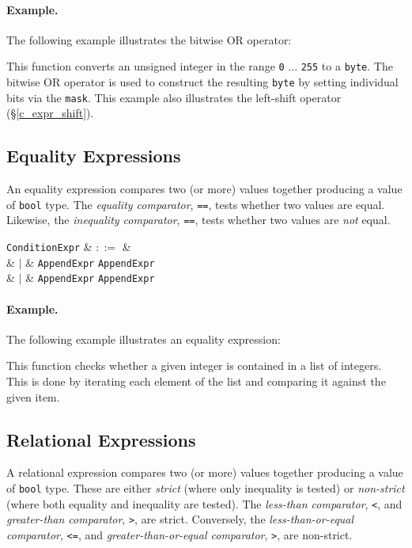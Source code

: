 \paragraph{Example.}  The following example illustrates the bitwise OR operator:



This function converts an unsigned integer in the range \lstinline{0} ... \lstinline{255} to a \lstinline{byte}.  The bitwise OR operator is used to construct the resulting \lstinline{byte} by setting individual bits via the \lstinline{mask}.  This example also illustrates the left-shift operator (\S\ref{c_expr_shift}).


\subsection{Equality Expressions}
\label{c_expr_equality}
An equality expression compares two (or more) values together producing a value of \lstinline{bool} type.  The {\em equality comparator}, \lstinline{==}, tests whether two values are equal.  Likewise, the {\em inequality comparator}, \lstinline{==}, tests whether two values are {\em not} equal.

\begin{syntax}
  \verb+ConditionExpr+ & $::=$ &\\
  & $|$ & \verb+AppendExpr+ \token{==} \verb+AppendExpr+\\
  & $|$ & \verb+AppendExpr+ \token{!=} \verb+AppendExpr+\\
\end{syntax}

\paragraph{Example.}

The following example illustrates an equality expression:



This function checks whether a given integer is contained in a list of integers.  This is done by iterating each element of the list and comparing it against the given item.


\subsection{Relational Expressions}
\label{c_expr_relational}
A relational expression compares two (or more) values together producing a value of \lstinline{bool} type.  These are either {\em strict} (where only inequality is tested)  or {\em non-strict} (where both equality and inequality are tested).  The {\em less-than comparator}, \lstinline{<}, and {\em greater-than comparator}, \lstinline{>}, are strict.  Conversely, the {\em less-than-or-equal comparator}, \lstinline{<=}, and {\em greater-than-or-equal comparator}, \lstinline{>}, are non-strict.

